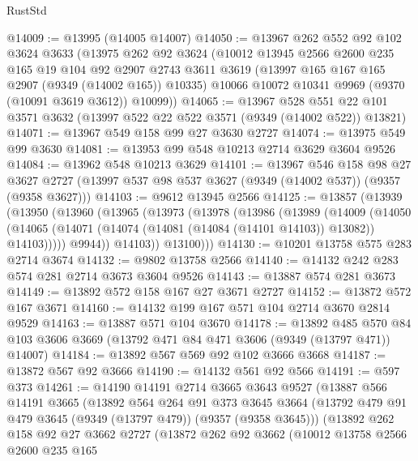 \begin{lexlean}{RustStd}
\begin{coremodule}
{\begin{coremodule}
{{{{{{{{{{{{{{{{{{{{{{{{{{{{{{{{{{{{{{{@14009 := @13995 (@14005 @14007)
@14050 := @13967
    @262
    @552
    @92
    @102
    @3624
    @3633
    (@13975
      @262
      @92
      @3624
      (@10012
        @13945
        @2566
        @2600
        @235
        @165
        @19
        @104
        @92
        @2907
        @2743
        @3611
        @3619
        (@13997 @165 @167 @165 @2907 (@9349 (@14002 @165)) @10335)
        @10066
        @10072
        @10341
        @9969
        (@9370 (@10091 @3619 @3612))
        @10099))
@14065 := @13967
    @528
    @551
    @22
    @101
    @3571
    @3632
    (@13997 @522 @22 @522 @3571 (@9349 (@14002 @522)) @13821)
@14071 := @13967 @549 @158 @99 @27 @3630 @2727
@14074 := @13975 @549 @99 @3630
@14081 := @13953 @99 @548 @10213 @2714 @3629 @3604 @9526
@14084 := @13962 @548 @10213 @3629
@14101 := @13967
    @546
    @158
    @98
    @27
    @3627
    @2727
    (@13997 @537 @98 @537 @3627 (@9349 (@14002 @537)) (@9357 (@9358 @3627)))
@14103 := @9612 @13945 @2566
@14125 := @13857
    (@13939
      (@13950
        (@13960
          (@13965
            (@13973
              (@13978
                (@13986
                  (@13989
                    (@14009
                      (@14050
                        (@14065
                          (@14071 (@14074 (@14081 (@14084 (@14101 @14103)) @13082)) @14103)))))
                  @9944))
              @14103))
          @13100)))
@14130 := @10201 @13758 @575 @283 @2714 @3674
@14132 := @9802 @13758 @2566
@14140 := @14132 @242 @283 @574 @281 @2714 @3673 @3604 @9526
@14143 := @13887 @574 @281 @3673
@14149 := @13892 @572 @158 @167 @27 @3671 @2727
@14152 := @13872 @572 @167 @3671
@14160 := @14132 @199 @167 @571 @104 @2714 @3670 @2814 @9529
@14163 := @13887 @571 @104 @3670
@14178 := @13892
    @485
    @570
    @84
    @103
    @3606
    @3669
    (@13792 @471 @84 @471 @3606 (@9349 (@13797 @471)) @14007)
@14184 := @13892 @567 @569 @92 @102 @3666 @3668
@14187 := @13872 @567 @92 @3666
@14190 := @14132 @561 @92 @566
@14191 := @597 @373
@14261 := @14190
    @14191
    @2714
    @3665
    @3643
    @9527
    (@13887
      @566
      @14191
      @3665
      (@13892
        @564
        @264
        @91
        @373
        @3645
        @3664
        (@13792 @479 @91 @479 @3645 (@9349 (@13797 @479)) (@9357 (@9358 @3645)))
        (@13892
          @262
          @158
          @92
          @27
          @3662
          @2727
          (@13872
            @262
            @92
            @3662
            (@10012
              @13758
              @2566
              @2600
              @235
              @165
}}}}}}}}}}}}}}}}}}}}}}}}}}}}}}}}}}}}}}}
\end{coremodule}}
\end{coremodule}
\end{lexlean}
